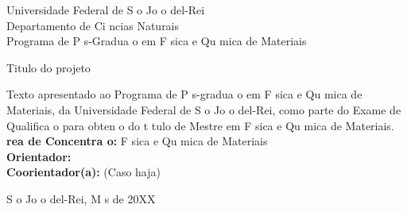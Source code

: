 \documentclass{article}
\begin{document}
\begin{center}

\vspace*{-1cm}

{\fontsize{14}{0} \selectfont Universidade Federal de S o Jo o del-Rei\\
\vspace{0.3cm}
Departamento de Ci ncias Naturais\\
\vspace{0.3cm}
Programa de P s-Gradua o em F sica e Qu mica de Materiais}

\vspace{6cm}


{\fontsize{16}{0} \selectfont Titulo do projeto}\\
\vspace{0.15cm}
\vspace{0.15cm}

\vspace{6cm}

\begin{flushright}
\begin{minipage}[b][4.5cm][c]{9.7cm}	%
Texto apresentado ao Programa de P s-gradua o em F sica e Qu mica de Materiais, da Universidade Federal de S o Jo o del-Rei, como parte do Exame de Qualifica o para obten o do t tulo de Mestre em F sica e Qu mica de Materiais.\\
\textbf{ rea de Concentra o:} F sica e Qu mica de Materiais\\
\textbf{Orientador:} \\
\textbf{Coorientador(a):} (Caso haja)
\end{minipage}
\end{flushright}



\vfill


{\fontsize{12}{0} \selectfont S o Jo o del-Rei, M s de 20XX}\\
\end{center}
\end{document}
